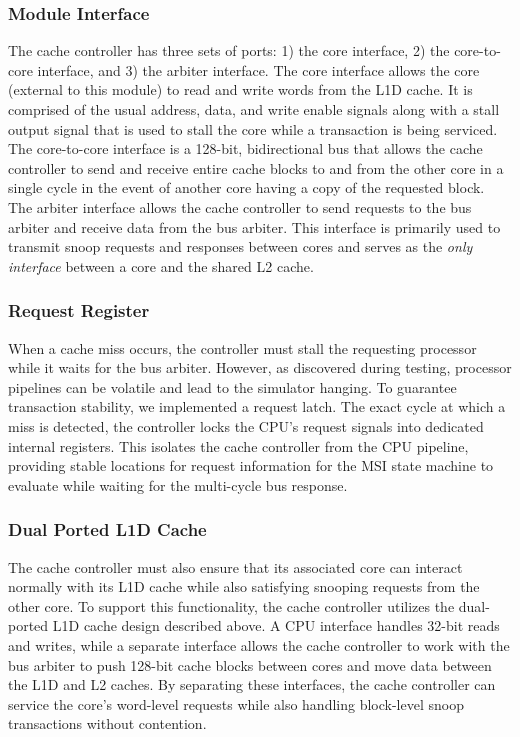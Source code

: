 \documentclass[10pt, compsoc]{IEEEtran}
\begin{document}
\subsubsection*{Module Interface}

The cache controller has three sets of ports: 1) the core interface, 2) the core-to-core interface, and 3) the arbiter interface. The core interface allows the core (external to this module) to read and write words from the L1D cache. It is comprised of the usual address, data, and write enable signals along with a stall output signal that is used to stall the core while a transaction is being serviced. The core-to-core interface is a 128-bit, bidirectional bus that allows the cache controller to send and receive entire cache blocks to and from the other core in a single cycle in the event of another core having a copy of the requested block. The arbiter interface allows the cache controller to send requests to the bus arbiter and receive data from the bus arbiter. This interface is primarily used to transmit snoop requests and responses between cores and serves as the \textit{only interface} between a core and the shared L2 cache. 



\subsubsection*{Request Register}

When a cache miss occurs, the controller must stall the requesting processor while it waits for the bus arbiter. However, as discovered during testing, processor pipelines can be volatile and lead to the simulator hanging. To guarantee transaction stability, we implemented a request latch. The exact cycle at which a miss is detected, the controller locks the CPU's request signals into dedicated internal registers. This isolates the cache controller from the CPU pipeline, providing stable locations for request information for the MSI state machine to evaluate while waiting for the multi-cycle bus response. 



\subsubsection*{Dual Ported L1D Cache}

The cache controller must also ensure that its associated core can interact normally with its L1D cache while also satisfying snooping requests from the other core. To support this functionality, the cache controller utilizes the dual-ported L1D cache design described above. A CPU interface handles 32-bit reads and writes, while a separate interface allows the cache controller to work with the bus arbiter to push 128-bit cache blocks between cores and move data between the L1D and L2 caches. By separating these interfaces, the cache controller can service the core's word-level requests while also handling block-level snoop transactions without contention.
\end{document}
